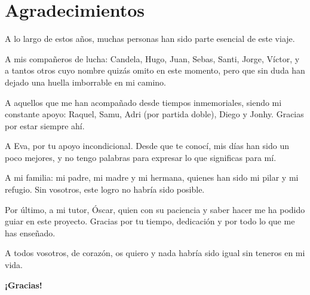 \chapter*{Agradecimientos}

A lo largo de estos años, muchas personas han sido parte esencial de este viaje.

A mis compañeros de lucha: Candela, Hugo, Juan, Sebas, Santi, Jorge, Víctor, y a tantos otros cuyo nombre quizás omito en este momento, pero que sin duda han dejado una huella imborrable en mi camino.

A aquellos que me han acompañado desde tiempos inmemoriales, siendo mi constante apoyo: Raquel, Samu, Adri (por partida doble), Diego y Jonhy. Gracias por estar siempre ahí.

A Eva, por tu apoyo incondicional. Desde que te conocí, mis días han sido un poco mejores, y no tengo palabras para expresar lo que significas para mí.

A mi familia: mi padre, mi madre y mi hermana, quienes han sido mi pilar y mi refugio. Sin vosotros, este logro no habría sido posible.

Por último, a mi tutor, Óscar, quien con su paciencia y saber hacer me ha podido guiar en este proyecto. Gracias por tu tiempo, dedicación y por todo lo que me has enseñado.

A todos vosotros, de corazón, os quiero y nada habría sido igual sin teneros en mi vida.

\begin{center}
\vspace{2cm}
\Huge{\textbf{¡Gracias!}}
\end{center}
